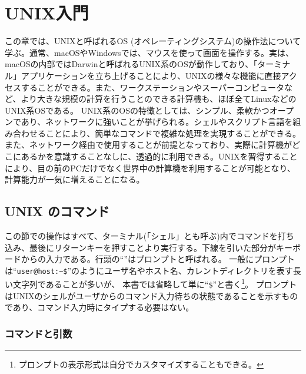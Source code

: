 \chapter{UNIX入門}

\noindent
この章では、UNIXと呼ばれるOS (オペレーティングシステム)の操作法について学ぶ。通常、macOSやWindowsでは、マウスを使って画面を操作する。実は、macOSの内部ではDarwinと呼ばれるUNIX系のOSが動作しており、「ターミナル」アプリケーションを立ち上げることにより、UNIXの様々な機能に直接アクセスすることができる。また、ワークステーションやスーパーコンピュータなど、より大きな規模の計算を行うことのできる計算機も、ほぼ全てLinuxなどのUNIX系OSである。
UNIX系のOSの特徴としては、シンプル、柔軟かつオープンであり、ネットワークに強いことが挙げられる。シェルやスクリプト言語を組み合わせることにより、簡単なコマンドで複雑な処理を実現することができる。また、ネットワーク経由で使用することが前提となっており、実際に計算機がどこにあるかを意識することなしに、透過的に利用できる。UNIXを習得することにより、目の前のPCだけでなく世界中の計算機を利用することが可能となり、計算能力が一気に増えることになる。

\section{UNIX のコマンド}

この節での操作はすべて、ターミナル(「シェル」とも呼ぶ)内でコマンドを打ち込み、最後にリターンキーを押すことより実行する。下線を引いた部分がキーボードからの入力である。行頭の``\texttt{\promptn}''はプロンプトと呼ばれる。
一般にプロンプトは``\texttt{user@host:\~{}\$}''のようにユーザ名やホスト名、カレントディレクトリを表す長い文字列であることが多いが、
本書では省略して単に``\texttt{\$}''と書く\footnote{プロンプトの表示形式は自分でカスタマイズすることもできる。}。
プロンプトはUNIXのシェルがユーザからのコマンド入力待ちの状態であることを示すものであり、コマンド入力時にタイプする必要はない。

\subsection{コマンドと引数}
\label{sec:unix:command}


